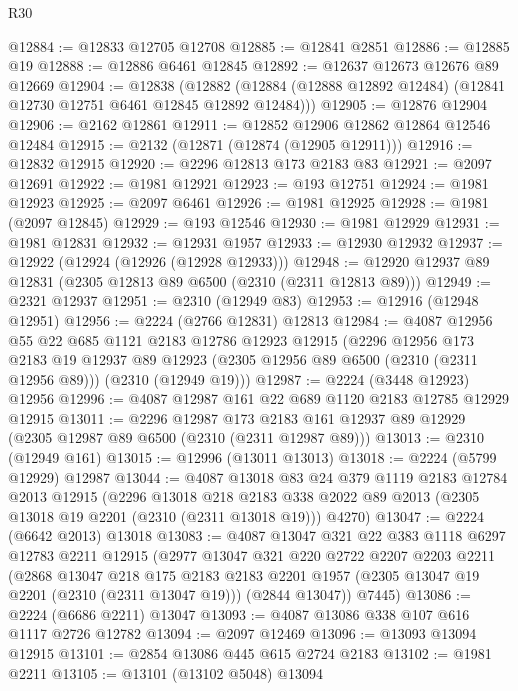 \begin{lexlean}{R30}
\begin{coremodule}
@12884 := @12833 @12705 @12708
@12885 := @12841 @2851
@12886 := @12885 @19
@12888 := @12886 @6461 @12845
@12892 := @12637 @12673 @12676 @89 @12669
@12904 := @12838
    (@12882 (@12884 (@12888 @12892 @12484) (@12841 @12730 @12751 @6461 @12845 @12892 @12484)))
@12905 := @12876 @12904
@12906 := @2162 @12861
@12911 := @12852 @12906 @12862 @12864 @12546 @12484
@12915 := @2132 (@12871 (@12874 (@12905 @12911)))
@12916 := @12832 @12915
@12920 := @2296 @12813 @173 @2183 @83
@12921 := @2097 @12691
@12922 := @1981 @12921
@12923 := @193 @12751
@12924 := @1981 @12923
@12925 := @2097 @6461
@12926 := @1981 @12925
@12928 := @1981 (@2097 @12845)
@12929 := @193 @12546
@12930 := @1981 @12929
@12931 := @1981 @12831
@12932 := @12931 @1957
@12933 := @12930 @12932
@12937 := @12922 (@12924 (@12926 (@12928 @12933)))
@12948 := @12920 @12937 @89 @12831 (@2305 @12813 @89 @6500 (@2310 (@2311 @12813 @89)))
@12949 := @2321 @12937
@12951 := @2310 (@12949 @83)
@12953 := @12916 (@12948 @12951)
@12956 := @2224 (@2766 @12831) @12813
@12984 := @4087
    @12956
    @55
    @22
    @685
    @1121
    @2183
    @12786
    @12923
    @12915
    (@2296
      @12956
      @173
      @2183
      @19
      @12937
      @89
      @12923
      (@2305 @12956 @89 @6500 (@2310 (@2311 @12956 @89)))
      (@2310 (@12949 @19)))
@12987 := @2224 (@3448 @12923) @12956
@12996 := @4087 @12987 @161 @22 @689 @1120 @2183 @12785 @12929 @12915
@13011 := @2296
    @12987
    @173
    @2183
    @161
    @12937
    @89
    @12929
    (@2305 @12987 @89 @6500 (@2310 (@2311 @12987 @89)))
@13013 := @2310 (@12949 @161)
@13015 := @12996 (@13011 @13013)
@13018 := @2224 (@5799 @12929) @12987
@13044 := @4087
    @13018
    @83
    @24
    @379
    @1119
    @2183
    @12784
    @2013
    @12915
    (@2296
      @13018
      @218
      @2183
      @338
      @2022
      @89
      @2013
      (@2305 @13018 @19 @2201 (@2310 (@2311 @13018 @19)))
      @4270)
@13047 := @2224 (@6642 @2013) @13018
@13083 := @4087
    @13047
    @321
    @22
    @383
    @1118
    @6297
    @12783
    @2211
    @12915
    (@2977
      @13047
      @321
      @220
      @2722
      @2207
      @2203
      @2211
      (@2868
        @13047
        @218
        @175
        @2183
        @2183
        @2201
        @1957
        (@2305 @13047 @19 @2201 (@2310 (@2311 @13047 @19)))
        (@2844 @13047))
      @7445)
@13086 := @2224 (@6686 @2211) @13047
@13093 := @4087 @13086 @338 @107 @616 @1117 @2726 @12782
@13094 := @2097 @12469
@13096 := @13093 @13094 @12915
@13101 := @2854 @13086 @445 @615 @2724 @2183
@13102 := @1981 @2211
@13105 := @13101 (@13102 @5048) @13094

\end{coremodule}
\end{lexlean}
